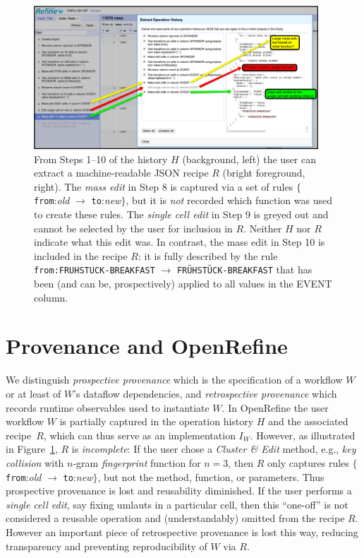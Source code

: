 \documentclass[runningheads]{llncs}
\begin{document}
\begin{figure}[t]
\centering
\includegraphics[width=0.95\textwidth]{figs/OR-missing-brighter.png} 
\caption{From Steps 1--10  of the history $H$ (background, left) the user can extract a machine-readable JSON recipe $R$ (bright foreground, right). The \emph{mass edit} in Step 8 is captured via a set of rules $\{$\texttt{from}:\emph{old} $\to$ \texttt{to}:\emph{new}$\}$, but it is \emph{not} recorded which function was used to create these rules. The \emph{single cell edit} in Step 9 is greyed out and cannot be selected by the user for inclusion in  $R$. Neither $H$ nor  $R$ indicate what this edit was. In contrast, the mass edit in Step 10 is included in the recipe $R$: it is fully described by the rule \texttt{from:FRUHSTUCK-BREAKFAST} $\to$ \texttt{FR\"UHST\"UCK-BREAKFAST} that has been (and can be, prospectively)  applied  to all values in the EVENT column.
}  
\label{fig:missing} 
\end{figure}



\section{Provenance and OpenRefine}\label{sec:prov-openr}

We distinguish \emph{prospective provenance} which is the specification of a workflow $W$ or at
least of $W$'s dataflow dependencies, and \emph{retrospective provenance} which records runtime
observables used to instantiate $W$. In OpenRefine the user workflow $W$ is partially captured in
the operation history $H$ and the associated recipe~$R$, which can thus serve as an implementation
$I_W$. However, as illustrated in Figure~\ref{fig:missing}, $R$ is \emph{incomplete}: If the user
chose a \emph{Cluster \& Edit} method, e.g., \emph{key collision} with $n$-gram \emph{fingerprint}
function for $n=3$, then $R$ only captures rules $\{$\texttt{from}:\emph{old} $\to$
\texttt{to}:\emph{new}$\}$, but not the method, function, or parameters. Thus prospective provenance
is lost and reusability diminished. If the user performs a \emph{single cell edit}, say fixing
umlauts in a particular cell, then this ``one-off'' is not considered a reusable operation and
(understandably) omitted from the recipe $R$. However an important piece of retrospective provenance
is lost this way, reducing transparency and preventing reproducibility of $W$ via $R$.
\end{document}
